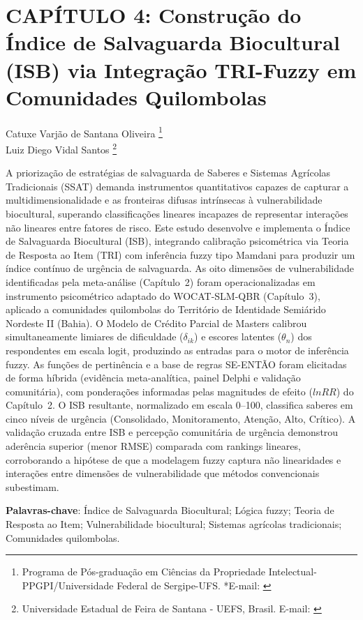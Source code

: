 ﻿\pagestyle{plain}

\chapter{CAPÍTULO 4: Construção do Índice de Salvaguarda Biocultural (ISB) via Integração TRI-Fuzzy em Comunidades Quilombolas}


\begin{flushright}
Catuxe Varjão de Santana Oliveira  \footnote[1]{Programa de Pós-graduação em Ciências da Propriedade Intelectual-PPGPI/Universidade Federal de Sergipe-UFS. *E-mail:  \href{mailto:catuxe@academico.ufs.br}{}}
\\[0.3cm]
Luiz Diego Vidal Santos \footnote[2]{Universidade Estadual de Feira de Santana - UEFS, Brasil. E-mail: \href{mailto:ldvsantos@uefs.br}{}}
\end{flushright}


{\renewcommand{\PRIVATEbookmarkthis}[1]{}%
\begin{resumoumacoluna}
A priorização de estratégias de salvaguarda de Saberes e Sistemas Agrícolas Tradicionais (SSAT) demanda instrumentos quantitativos capazes de capturar a multidimensionalidade e as fronteiras difusas intrínsecas à vulnerabilidade biocultural, superando classificações lineares incapazes de representar interações não lineares entre fatores de risco. Este estudo desenvolve e implementa o Índice de Salvaguarda Biocultural (ISB), integrando calibração psicométrica via Teoria de Resposta ao Item (TRI) com inferência fuzzy tipo Mamdani para produzir um índice contínuo de urgência de salvaguarda. As oito dimensões de vulnerabilidade identificadas pela meta-análise (Capítulo~2) foram operacionalizadas em instrumento psicométrico adaptado do WOCAT-SLM-QBR (Capítulo~3), aplicado a comunidades quilombolas do Território de Identidade Semiárido Nordeste II (Bahia). O Modelo de Crédito Parcial de Masters calibrou simultaneamente limiares de dificuldade ($\delta_{ik}$) e escores latentes ($\theta_n$) dos respondentes em escala logit, produzindo as entradas para o motor de inferência fuzzy. As funções de pertinência e a base de regras SE-ENTÃO foram elicitadas de forma híbrida (evidência meta-analítica, painel Delphi e validação comunitária), com ponderações informadas pelas magnitudes de efeito ($lnRR$) do Capítulo~2. O ISB resultante, normalizado em escala 0--100, classifica saberes em cinco níveis de urgência (Consolidado, Monitoramento, Atenção, Alto, Crítico). A validação cruzada entre ISB e percepção comunitária de urgência demonstrou aderência superior (menor RMSE) comparada com rankings lineares, corroborando a hipótese de que a modelagem fuzzy captura não linearidades e interações entre dimensões de vulnerabilidade que métodos convencionais subestimam.

\vspace{\onelineskip}
\noindent
\textbf{Palavras-chave}: Índice de Salvaguarda Biocultural; Lógica fuzzy; Teoria de Resposta ao Item; Vulnerabilidade biocultural; Sistemas agrícolas tradicionais; Comunidades quilombolas.
\end{resumoumacoluna}}

